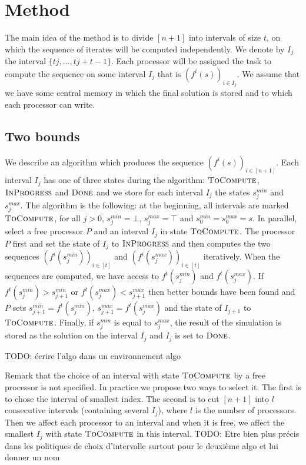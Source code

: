 \documentclass[a4paper,10pt]{article}
\newcommand{\todo}[1]{{\color{red} TODO: {#1}}}
\begin{document}
\section{Method}

The main idea of the method is to divide $[n+1]$ into intervals of size $t$, on which the sequence of iterates will 
be computed independently.
We denote by $I_j$ the interval $\{tj, \dots, tj + t -1\}$. Each processor will be assigned the task to compute 
the sequence on some interval $I_j$ that is $(f^i(s))_{i \in I_j}$. We assume that we have some central memory in which the final solution is stored and to which each processor can write.


\subsection{Two bounds}

We describe an algorithm which produces the sequence  $(f^i(s))_{i\in [n+1]}$. Each interval $I_j$ has one of three states during the algorithm: $\textsc{ToCompute}$, $\textsc{InProgress}$ and $\textsc{Done}$ and we store for each interval $I_j$ the states $s_j^{min}$ and $s_j^{max}$.
The algorithm is the following: at the beginning, all intervals are marked $\textsc{ToCompute}$, for all $j >0$, 
$s_j^{min} = \bot$, $s_j^{max} = \top$ and $s_0^{min} = s_0^{max} = s$. 
In parallel, select a free processor $P$ and an interval $I_j$ in state $\textsc{ToCompute}$. 
The processor $P$ first and set the state of $I_j$ to $\textsc{InProgress}$ and then computes the two sequences $(f^i(s_j^{min}))_{i \in [t]}$ and $(f^i(s_j^{max}))_{i \in [t]}$ iteratively. When the sequences are computed, we have access to $f^t(s_j^{min})$ and 
 $f^t(s_j^{max})$. If $f^t(s_j^{min}) > s_{j+1}^{min}$ or $f^t(s_j^{max}) < s_{j+1}^{max}$ then better bounds have been found and $P$ sets $s_{j+1}^{min} = f^t(s_j^{min})$, $s_{j+1}^{max} = f^t(s_j^{max})$ and the state of $I_{j+1}$ to $\textsc{ToCompute}$.
Finally, if $s_j^{min}$ is equal to $s_j^{max}$, the result of the simulation is stored as the solution on the interval $I_j$
and $I_j$ is set to $\textsc{Done}$.

 \todo{écrire l'algo dans un environnement algo}
 
Remark that the choice of an interval with state $\textsc{ToCompute}$ by a free processor is not specified. 
In practice we propose two ways to select it. The first is to chose the interval of smallest index. 
The second is to cut $[n+1]$ into $l$ consecutive intervals (containing several $I_j$), where $l$ is the number of processors. 
Then we affect each processor to an interval and when it is free, we affect the smallest $I_j$ with state $\textsc{ToCompute}$ in this interval.  
 \todo{Etre bien plus précis dans les politiques de choix d'intervalle surtout pour le deuxième algo et lui donner un nom}
 
\end{document}
